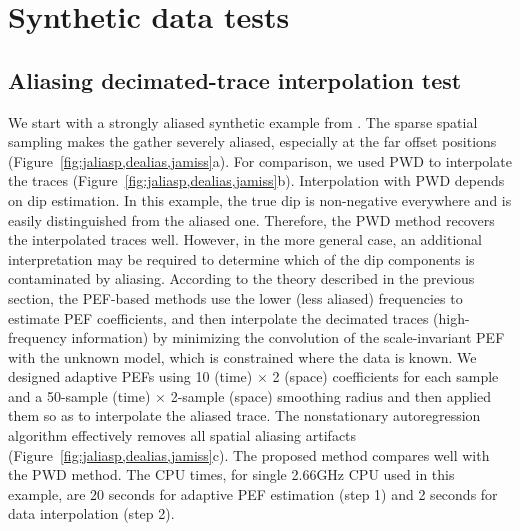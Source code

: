 \section{Synthetic data tests}

\subsection{Aliasing decimated-trace interpolation test}

We start with a strongly aliased synthetic example from
\cite{Claerbout09}. The sparse spatial sampling makes the gather
severely aliased, especially at the far offset positions
(Figure~\ref{fig:jaliasp,dealias,jamiss}a). For comparison, we used
PWD \cite[]{GEO67-06-19461960} to interpolate the traces
(Figure~\ref{fig:jaliasp,dealias,jamiss}b). Interpolation with PWD
depends on dip estimation. In this example, the true dip is
non-negative everywhere and is easily distinguished from the aliased
one. Therefore, the PWD method recovers the interpolated traces
well. However, in the more general case, an additional interpretation
may be required to determine which of the dip components is
contaminated by aliasing. According to the theory described in the
previous section, the PEF-based methods use the lower (less aliased)
frequencies to estimate PEF coefficients, and then interpolate the
decimated traces (high-frequency information) by minimizing the
convolution of the scale-invariant PEF with the unknown model, which
is constrained where the data is known. We designed adaptive PEFs
using 10 (time) $\times$ 2 (space) coefficients for each sample and a
50-sample (time) $\times$ 2-sample (space) smoothing radius and then
applied them so as to interpolate the aliased trace. The nonstationary
autoregression algorithm effectively removes all spatial aliasing
artifacts (Figure~\ref{fig:jaliasp,dealias,jamiss}c). The proposed
method compares well with the PWD method. The CPU times, for single
2.66GHz CPU used in this example, are 20 seconds for adaptive PEF
estimation (step 1) and 2 seconds for data interpolation (step 2).


